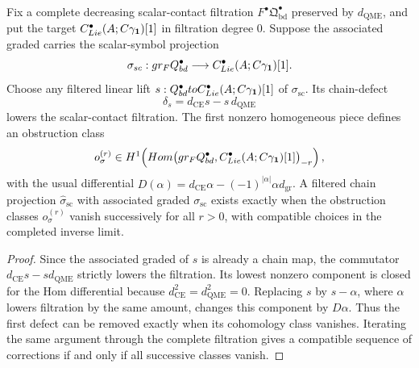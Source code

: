 \begin{lem}\label{lem:filtered-scalar-projection-obstruction}
  Fix a complete decreasing scalar-contact filtration
  \(F^\bullet\mathfrak Q^\bullet_{\mathrm{bd}}\) preserved by
  \(d_{\mathrm{QME}}\), and put the target
  \(C^\bullet_{Lie}(A;C\gamma_{\mathbf 1})[1]\) in
  filtration degree \(0\).  Suppose the associated graded carries the
  scalar-symbol projection
  \[
    \sigma_{sc}:
    gr_{F}Q^\bullet_{bd}
    \longrightarrow
    C^\bullet_{Lie}(A;C\gamma_{\mathbf 1})[1].
  \]
  Choose any filtered linear lift
  \(s:Q^\bullet_{bd}to
  C^\bullet_{Lie}(A;C\gamma_{\mathbf 1})[1]\) of
  \(\sigma_{\mathrm{sc}}\).  Its chain-defect
  \[
    \delta_s=d_{\mathrm{CE}}s-s\,d_{\mathrm{QME}}
  \]
  lowers the scalar-contact filtration.  The first nonzero homogeneous
  piece defines an obstruction class
  \[
    o_\sigma^{(r)}\in
    H^1\!\left(
      Hom\bigl(gr_{F}Q^\bullet_{bd},
      C^\bullet_{Lie}(A;C\gamma_{\mathbf 1})[1]\bigr)_{-r}
    \right),
  \]
  with the usual differential
  \(D(\alpha)=d_{\mathrm{CE}}\alpha-(-1)^{|\alpha|}\alpha d_{\operatorname{gr}}\).
  A filtered chain projection
  \(\widehat\sigma_{\mathrm{sc}}\) with associated graded
  \(\sigma_{\mathrm{sc}}\) exists exactly when the obstruction classes
  \(o_\sigma^{(r)}\) vanish successively for all \(r>0\), with compatible
  choices in the completed inverse limit.
\end{lem}

\begin{proof}
  Since the associated graded of \(s\) is already a chain map, the
  commutator \(d_{\mathrm{CE}}s-sd_{\mathrm{QME}}\) strictly lowers the
  filtration.  Its lowest nonzero component is closed for the Hom
  differential because
  \(d_{\mathrm{CE}}^2=d_{\mathrm{QME}}^2=0\).  Replacing \(s\) by
  \(s-\alpha\), where \(\alpha\) lowers filtration by the same amount,
  changes this component by \(D\alpha\).  Thus the first defect can be
  removed exactly when its cohomology class vanishes.  Iterating the same
  argument through the complete filtration gives a compatible sequence of
  corrections if and only if all successive classes vanish.
\end{proof}

